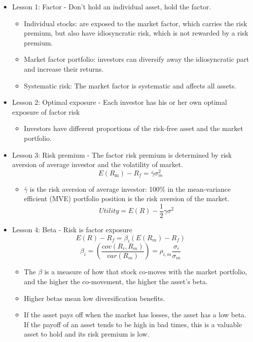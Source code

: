 \begin{itemize}
\item Lesson 1: Factor - Don't hold an individual asset, hold the factor.
    \begin{itemize}
    \item Individual stocks: are exposed to the market factor, which carries the risk premium, but also have idiosyncratic risk, which is not rewarded by a risk premium.
    \item Market factor portfolio: investors can diversify away the idiosyncratic part and increase their returns.
    \item Systematic risk: The market factor is systematic and affects all assets.
    \end{itemize}
\item Lesson 2: Optimal exposure - Each investor has his or her own optimal exposure of factor risk
    \begin{itemize}
    \item Investors have different proportions of the risk-free asset
    and the market portfolio.
    \end{itemize}
\item Lesson 3: Risk premium - The factor risk premium is determined by risk aversion of average investor and the volatility of market.
\[
E(R_{\mathrm{m}}) - R_{f} = \bar{\gamma} \sigma_{m}^{2}
\]
    \begin{itemize}
    \item $\bar{\gamma}$ is the risk aversion of average investor: 100\% in the mean-variance efficient (MVE) portfolio position is the risk aversion of the market.
    \[
Utility = E(R) - \frac{1}{2} \gamma \sigma^{2}
\]
    \end{itemize}
\item Lesson 4: Beta - Risk is factor exposure
    \[ E(R) - R_f = \beta_i (E(R_m) - R_f) \]
    \[\beta_i = \left( \dfrac{cov(R_i, R_m)}{var(R_m)} \right) = \rho_{i,m} \dfrac{\sigma_i}{\sigma_m}\]
    
    
    \begin{itemize}
    \item The $\beta$ is a measure of how that stock co-moves with the market portfolio, and the higher the co-movement, the higher the asset's beta.
    \item Higher betas mean low diversification benefits.
    \item If the asset pays off when the market has losses, the asset has a low beta. If the payoff of an asset tends to be high in bad times, this is a valuable asset to hold and its risk premium is low.
    \end{itemize}
\end{itemize}



